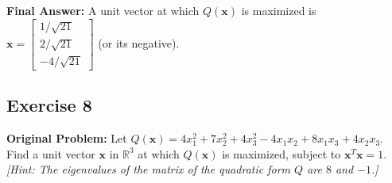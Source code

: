 \documentclass[11pt, letterpaper]{article}
\theoremstyle{definition}
\theoremstyle{remark}
\newcommand{\R}{\mathbb{R}}
\begin{document}
\textbf{Final Answer:} A unit vector at which $Q(\mathbf{x})$ is maximized is $\mathbf{x} = \begin{bmatrix} 1/\sqrt{21} \\ 2/\sqrt{21} \\ -4/\sqrt{21} \end{bmatrix}$ (or its negative).

\subsection{Exercise 8}
\textbf{Original Problem:} Let $Q(\mathbf{x}) = 4x_1^2 + 7x_2^2 + 4x_3^2 - 4x_1x_2 + 8x_1x_3 + 4x_2x_3$. Find a unit vector $\mathbf{x}$ in $\R^3$ at which $Q(\mathbf{x})$ is maximized, subject to $\mathbf{x}^T \mathbf{x} = 1$. \emph{[Hint: The eigenvalues of the matrix of the quadratic form $Q$ are $8$ and $-1$.]}
\end{document}
